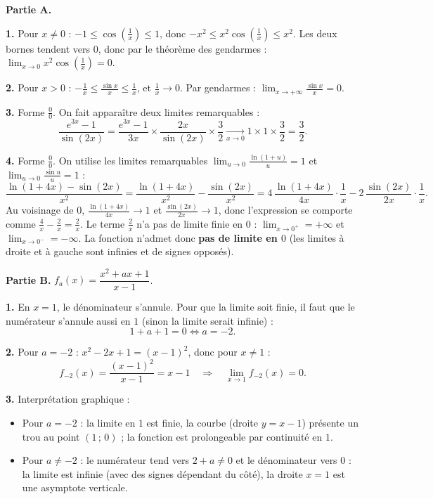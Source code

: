 \documentclass[11pt]{article}
\newcommand{\cle}[1]{{\popxbold\color{popdark}#1}}
\begin{document}
\begin{corrige}
\textbf{Partie A.}

\textbf{1.} Pour $x \neq 0$ : $-1 \le \cos\left(\frac{1}{x}\right) \le 1$, donc $-x^2 \le x^2\cos\left(\frac{1}{x}\right) \le x^2$. Les deux bornes tendent vers $0$, donc par le théorème des gendarmes : $\boxed{\lim_{x \to 0} x^2 \cos\left(\tfrac{1}{x}\right) = 0}$.

\textbf{2.} Pour $x > 0$ : $-\frac{1}{x} \le \frac{\sin x}{x} \le \frac{1}{x}$, et $\frac{1}{x} \to 0$. Par gendarmes : $\boxed{\lim_{x \to +\infty} \frac{\sin x}{x} = 0}$.

\textbf{3.} Forme $\frac{0}{0}$. On fait apparaître deux limites remarquables :
\[ \frac{e^{3x} - 1}{\sin(2x)} = \frac{e^{3x} - 1}{3x} \times \frac{2x}{\sin(2x)} \times \frac{3}{2} \xrightarrow[x \to 0]{} 1 \times 1 \times \frac{3}{2} = \boxed{\frac{3}{2}}. \]

\textbf{4.} Forme $\frac{0}{0}$. On utilise les limites remarquables $\lim_{u \to 0} \frac{\ln(1+u)}{u} = 1$ et $\lim_{u \to 0} \frac{\sin u}{u} = 1$ :
\[ \frac{\ln(1+4x) - \sin(2x)}{x^2} = \frac{\ln(1+4x)}{x^2} - \frac{\sin(2x)}{x^2} = 4\,\frac{\ln(1+4x)}{4x}\cdot\frac{1}{x} - 2\,\frac{\sin(2x)}{2x}\cdot\frac{1}{x}. \]
Au voisinage de $0$, $\frac{\ln(1+4x)}{4x} \to 1$ et $\frac{\sin(2x)}{2x} \to 1$, donc l'expression se comporte comme $\frac{4}{x} - \frac{2}{x} = \frac{2}{x}$.
Le terme $\frac{2}{x}$ n'a pas de limite finie en $0$ : $\lim_{x \to 0^+} = +\infty$ et $\lim_{x \to 0^-} = -\infty$. La fonction n'admet donc \textbf{pas de limite en $0$} (les limites à droite et à gauche sont infinies et de signes opposés).

\textbf{Partie B.} $f_a(x) = \dfrac{x^2 + ax + 1}{x - 1}$.

\textbf{1.} En $x = 1$, le dénominateur s'annule. Pour que la limite soit finie, il faut que le numérateur s'annule aussi en $1$ (sinon la limite serait infinie) :
\[ 1 + a + 1 = 0 \iff \boxed{a = -2}. \]

\textbf{2.} Pour $a = -2$ : $x^2 - 2x + 1 = (x-1)^2$, donc pour $x \neq 1$ :
\[ f_{-2}(x) = \frac{(x-1)^2}{x-1} = x - 1 \quad \Longrightarrow \quad \boxed{\lim_{x \to 1} f_{-2}(x) = 0}. \]

\textbf{3.} Interprétation graphique :
\begin{itemize}
    \item Pour $a = -2$ : la limite en $1$ est finie, la courbe (droite $y = x - 1$) présente un \cle{trou} au point $(1\,;\,0)$ ; la fonction est prolongeable par continuité en $1$.
    \item Pour $a \neq -2$ : le numérateur tend vers $2 + a \neq 0$ et le dénominateur vers $0$ : la limite est infinie (avec des signes dépendant du côté), la droite $x = 1$ est une \cle{asymptote verticale}.
\end{itemize}


\end{corrige}
\end{document}
